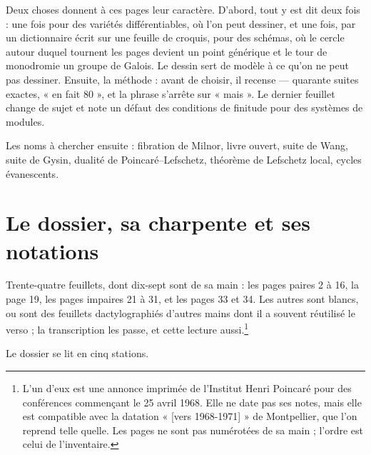 \documentclass[11pt,a4paper]{article}
\begin{document}
\begin{resume}
Deux choses donnent à ces pages leur caractère. D'abord, tout y est dit deux
fois : une fois pour des variétés différentiables, où l'on peut dessiner, et
une fois, par un dictionnaire écrit sur une feuille de croquis, pour des
schémas, où le cercle autour duquel tournent les pages devient un point
générique et le tour de monodromie un groupe de Galois. Le dessin sert de
modèle à ce qu'on ne peut pas dessiner. Ensuite, la méthode : avant de choisir,
il recense — quarante suites exactes, « en fait 80 », et la phrase s'arrête
sur « mais ». Le dernier feuillet change de sujet et note un défaut des
conditions de finitude pour des systèmes de modules.

Les noms à chercher ensuite : fibration de Milnor, livre ouvert, suite de
Wang, suite de Gysin, dualité de Poincaré--Lefschetz, théorème de Lefschetz
local, cycles évanescents.

\end{resume}

\section*{Le dossier, sa charpente et ses notations}

Trente-quatre feuillets, dont dix-sept sont de sa main : les pages paires 2 à
16, la page 19, les pages impaires 21 à 31, et les pages 33 et 34. Les autres
sont blancs, ou sont des feuillets dactylographiés d'autres mains dont il a
souvent réutilisé le verso ; la transcription les passe, et cette lecture
aussi.\footnote{L'un d'eux est une annonce imprimée de l'Institut Henri
Poincaré pour des conférences commençant le 25 avril 1968. Elle ne date pas
ses notes, mais elle est compatible avec la datation « [vers 1968-1971] » de
Montpellier, que l'on reprend telle quelle. Les pages ne sont pas numérotées de
sa main ; l'ordre est celui de l'inventaire.}

Le dossier se lit en cinq stations.
\end{document}
